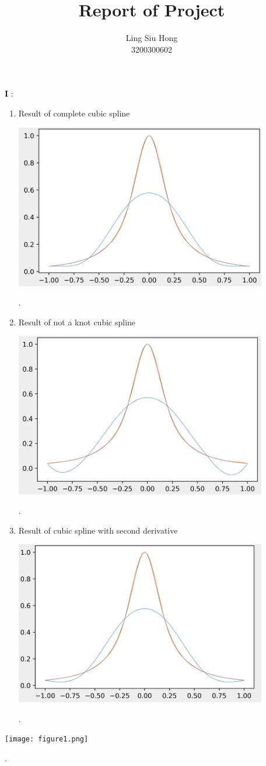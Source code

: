 \documentclass{article}
\title{\textbf{Report of Project}}
\author{Ling Siu Hong \\ 3200300602}
\begin{document}
\maketitle


\textbf{I} :
\begin{enumerate}
    \item Result of complete cubic spline
    \begin{center}
    \includegraphics[width=11cm]{complete.png}	
    \end{center}.
    
    \item Result of not a knot cubic spline
    \begin{center}
    \includegraphics[width=11cm]{knot.png}	
    \end{center}.

    \item Result of  cubic spline with second derivative
    \begin{center}
    \includegraphics[width=11cm]{second diff.png}	
    \end{center}.
    
\end{enumerate}

\begin{center}
    \texttt{[image: figure1.png]}	
\end{center}.
\end{document}
